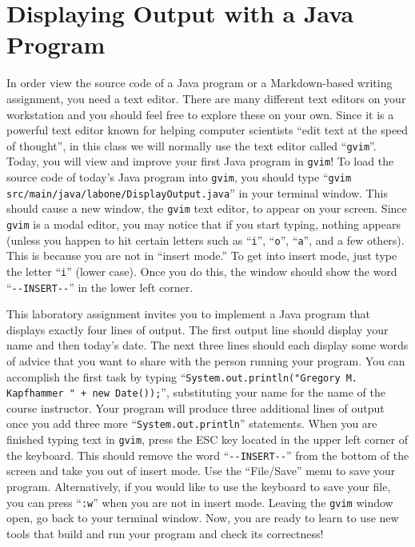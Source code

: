 \documentclass[11pt]{article}
\newcommand{\command}[1]{``\lstinline{#1}''}
\newcommand{\program}[1]{\lstinline{#1}}
\newcommand{\option}[1]{``{#1}''}
\begin{document}
\section*{Displaying Output with a Java Program}

In order view the source code of a Java program or a Markdown-based writing
assignment, you need a text editor. There are many different text editors on
your workstation and you should feel free to explore these on your own. Since
it is a powerful text editor known for helping computer scientists ``edit text
at the speed of thought'', in this class we will normally use the text editor
called \command{gvim}. Today, you will view and improve your first Java program
in {\tt gvim}! To load the source code of today's Java program into
\program{gvim}, you should type \command{gvim
src/main/java/labone/DisplayOutput.java} in your terminal window. This should
cause a new window, the \program{gvim} text editor, to appear on your screen.
Since \program{gvim} is a modal editor, you may notice that if you start
typing, nothing appears (unless you happen to hit certain letters such as
\command{i}, \command{o}, \command{a}, and a few others). This is because you
are not in ``insert mode.'' To get into insert mode, just type the letter
\command{i} (lower case). Once you do this, the window should show the word
\command{--INSERT--} in the lower left corner.

This laboratory assignment invites you to implement a Java program that
displays exactly four lines of output. The first output line should display
your name and then today's date. The next three lines should each display some
words of advice that you want to share with the person running your program.
You can accomplish the first task by typing
\command{System.out.println("Gregory M. Kapfhammer " + new Date());},
substituting your name for the name of the course instructor. Your program will
produce three additional lines of output once you add three more
\command{System.out.println} statements. When you are finished typing text in
\program{gvim}, press the ESC key located in the upper left corner of the
keyboard. This should remove the word \command{--INSERT--} from the bottom of
the screen and take you out of insert mode. Use the \option{File/Save} menu to
save your program. Alternatively, if you would like to use the keyboard to save
your file, you can press \command{:w} when you are not in insert mode. Leaving
the {\tt gvim} window open, go back to your terminal window. Now, you are ready
to learn to use new tools that build and run your program and check its
correctness!
\end{document}
